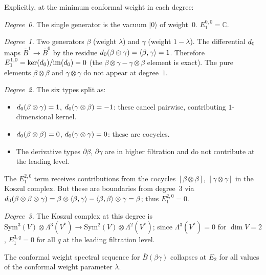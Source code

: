 \begin{computation}
\label{comp:betagamma-E1-explicit}
Explicitly, at the minimum conformal weight in each degree:

\emph{Degree~0.} The single generator is the vacuum $|0\rangle$ of
weight~$0$.  $E_1^{0,0} = \mathbb{C}$.

\emph{Degree~1.} Two generators $\beta$ (weight $\lambda$) and
$\gamma$ (weight $1-\lambda$).  The differential $d_0$ maps
$\bar{B}^1 \to \bar{B}^0$ by the residue
$d_0(\beta \otimes \gamma) = \langle \beta, \gamma \rangle = 1$.
Therefore $E_1^{1,0} = \ker(d_0)/\mathrm{im}(d_0) = 0$
(the $\beta \otimes \gamma - \gamma \otimes \beta$ element is
exact).  The pure elements $\beta \otimes \beta$ and
$\gamma \otimes \gamma$ do not appear at degree~$1$.

\emph{Degree~2.} The six types split as:
\begin{itemize}
\item $d_0(\beta \otimes \gamma) = 1$,
  $d_0(\gamma \otimes \beta) = -1$:
  these cancel pairwise, contributing $1$-dimensional kernel.
\item $d_0(\beta \otimes \beta) = 0$,
  $d_0(\gamma \otimes \gamma) = 0$: these are cocycles.
\item The derivative types $\partial\beta$, $\partial\gamma$
  are in higher filtration and do not contribute at the leading
  level.
\end{itemize}
The $E_1^{2,0}$ term receives contributions from the cocycles
$[\beta \otimes \beta]$, $[\gamma \otimes \gamma]$ in the
Koszul complex.  But these are boundaries from degree~$3$
via $d_0(\beta \otimes \beta \otimes \gamma)
= \beta \otimes \langle \beta, \gamma \rangle
- \langle \beta, \beta \rangle \otimes \gamma = \beta$; thus
$E_1^{2,0} = 0$.

\emph{Degree~3.} The Koszul complex at this degree is
$\mathrm{Sym}^3(V) \otimes \Lambda^3(V^*) \to
\mathrm{Sym}^2(V) \otimes \Lambda^2(V^*)$;
since $\Lambda^3(V^*) = 0$ for $\dim V = 2$,
$E_1^{3,q} = 0$ for all $q$ at the leading filtration level.
\end{computation}

\begin{proposition}
\label{prop:betagamma-ss-collapse}
The conformal weight spectral sequence for $\bar{B}(\beta\gamma)$
collapses at $E_2$ for all values of the conformal weight
parameter $\lambda$.
\end{proposition}

